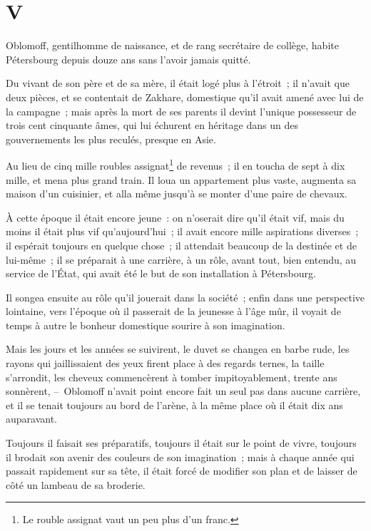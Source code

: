 \documentclass[french,twoside]{book} %
\begin{document}
\section[{V}]{V}\renewcommand{\leftmark}{V}

\noindent Oblomoff, gentilhomme de naissance, et de rang secrétaire de collège, habite Pétersbourg depuis douze ans sans l’avoir jamais quitté.\par
Du vivant de son père et de sa mère, il était logé plus à l’étroit ; il n’avait que deux pièces, et se contentait de Zakhare, domestique qu’il avait amené avec lui de la campagne ; mais après la mort de ses parents il devint l’unique possesseur de trois cent cinquante âmes, qui lui échurent en héritage dans un des gouvernements les plus reculés, presque en Asie.\par
Au lieu de cinq mille roubles assignat\footnote{Le rouble assignat vaut un peu plus d’un franc.} de revenus ; il en toucha de sept à dix mille, et mena plus grand train. Il loua un appartement plus vaste, augmenta sa maison d’un cuisinier, et alla même jusqu’à se monter d’une paire de chevaux.\par
À cette époque il était encore jeune : on n’oserait dire qu’il était vif, mais du moins il était plus vif qu’aujourd’hui ; il avait encore mille aspirations diverses ; il espérait toujours en quelque chose ; il attendait beaucoup de la destinée et de lui-même ; il se préparait à une carrière, à un rôle, avant tout, bien entendu, au service de l’État, qui avait été le but de son installation à Pétersbourg.\par
Il songea ensuite au rôle qu’il jouerait dans la société ; enfin dans une perspective lointaine, vers l’époque où il passerait de la jeunesse à l’âge mûr, il voyait de temps à autre le bonheur domestique sourire à son imagination.\par
Mais les jours et les années se suivirent, le duvet se changea en barbe rude, les rayons qui jaillissaient des yeux firent place à des regards ternes, la taille s’arrondit, les cheveux commencèrent à tomber impitoyablement, trente ans sonnèrent, – Oblomoff n’avait point encore fait un seul pas dans aucune carrière, et il se tenait toujours au bord de l’arène, à la même place où il était dix ans auparavant.\par
Toujours il faisait ses préparatifs, toujours il était sur le point de vivre, toujours il brodait son avenir des couleurs de son imagination ; mais à chaque année qui passait rapidement sur sa tête, il était forcé de modifier son plan et de laisser de côté un lambeau de sa broderie.\par
\end{document}
